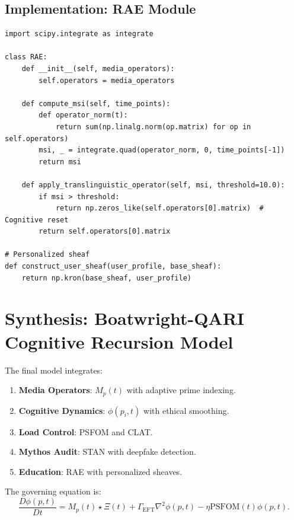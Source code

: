 \documentclass[12pt]{article}
\begin{document}
\subsection{Implementation: RAE Module}
\begin{verbatim}
import scipy.integrate as integrate

class RAE:
    def __init__(self, media_operators):
        self.operators = media_operators
    
    def compute_msi(self, time_points):
        def operator_norm(t):
            return sum(np.linalg.norm(op.matrix) for op in self.operators)
        msi, _ = integrate.quad(operator_norm, 0, time_points[-1])
        return msi
    
    def apply_translinguistic_operator(self, msi, threshold=10.0):
        if msi > threshold:
            return np.zeros_like(self.operators[0].matrix)  # Cognitive reset
        return self.operators[0].matrix

# Personalized sheaf
def construct_user_sheaf(user_profile, base_sheaf):
    return np.kron(base_sheaf, user_profile)
\end{verbatim}

\section{Synthesis: Boatwright-QARI Cognitive Recursion Model}
The final model integrates:
\begin{enumerate}
    \item \textbf{Media Operators}: $M_p(t)$ with adaptive prime indexing.
    \item \textbf{Cognitive Dynamics}: $\phi(p_i, t)$ with ethical smoothing.
    \item \textbf{Load Control}: PSFOM and CLAT.
    \item \textbf{Mythos Audit}: STAN with deepfake detection.
    \item \textbf{Education}: RAE with personalized sheaves.
\end{enumerate}
The governing equation is:
\[
\frac{D \phi(p,t)}{Dt} = M_p(t) \star \Xi(t) + \Gamma_{\text{EFT}} \nabla^2 \phi(p,t) - \eta \text{PSFOM}(t) \phi(p,t).
\]
\end{document}
